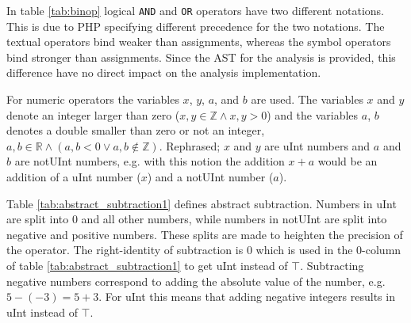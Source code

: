 In table \ref{tab:binop} logical \texttt{AND} and \texttt{OR} operators have two different notations. This is due to PHP specifying different precedence for the two notations. The textual operators bind weaker than assignments, whereas the symbol operators bind stronger than assignments. Since the AST for the analysis is provided, this difference have no direct impact on the analysis implementation.

For numeric operators the variables $x$, $y$, $a$, and $b$ are used. The variables $x$ and $y$ denote an integer larger than zero ($x, y \in \mathbb{Z} \wedge x, y > 0$) and the variables $a$, $b$ denotes a double smaller than zero or not an integer, $a, b \in \mathbb{R} \wedge (a, b < 0 \vee a, b \notin \mathbb{Z})$. Rephrased; $x$ and $y$ are uInt numbers and $a$ and $b$ are notUInt numbers, e.g. with this notion the addition $x+a$ would be an addition of a uInt number ($x$) and a notUInt number ($a$).


Table \ref{tab:abstract_subtraction1} defines abstract subtraction. Numbers in uInt are split into 0 and all other numbers, while numbers in notUInt are split into negative and positive numbers. These splits are made to heighten the precision of the operator. The right-identity of subtraction is 0 which is used in the 0-column of table \ref{tab:abstract_subtraction1} to get uInt instead of $\top$. Subtracting negative numbers correspond to adding the absolute value of the number, e.g. $5 - (-3) = 5 + 3$. For uInt this means that adding negative integers results in uInt instead of $\top$.

